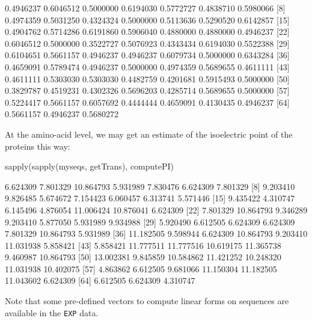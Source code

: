 \documentclass{article}
\begin{document}
\begin{Schunk}
\begin{Soutput}
 [1] 0.4946237 0.6046512 0.5000000 0.6194030 0.5772727 0.4838710 0.5980066
 [8] 0.4974359 0.5031250 0.4324324 0.5000000 0.5113636 0.5290520 0.6142857
[15] 0.4904762 0.5714286 0.6191860 0.5906040 0.4880000 0.4880000 0.4946237
[22] 0.6046512 0.5000000 0.3522727 0.5076923 0.4343434 0.6194030 0.5522388
[29] 0.6104651 0.5661157 0.4946237 0.4946237 0.6079734 0.5000000 0.6343284
[36] 0.4659091 0.5789474 0.4946237 0.5000000 0.4974359 0.5689655 0.4611111
[43] 0.4611111 0.5303030 0.5303030 0.4482759 0.4201681 0.5915493 0.5000000
[50] 0.3829787 0.4519231 0.4302326 0.5696203 0.4285714 0.5689655 0.5000000
[57] 0.5224417 0.5661157 0.6057692 0.4444444 0.4659091 0.4130435 0.4946237
[64] 0.5661157 0.4946237 0.5680272
\end{Soutput}
\end{Schunk}

At the amino-acid level, we may get an estimate of the isoelectric point of
the proteins this way:

\begin{Schunk}
\begin{Sinput}
 sapply(sapply(myseqs, getTrans), computePI)
\end{Sinput}
\begin{Soutput}
 [1]  6.624309  7.801329 10.864793  5.931989  7.830476  6.624309  7.801329
 [8]  9.203410  9.826485  5.674672  7.154423  6.060457  6.313741  5.571446
[15]  9.435422  4.310747  6.145496  4.876054 11.006424 10.876041  6.624309
[22]  7.801329 10.864793  9.346289  9.203410  5.877050  5.931989  9.934988
[29]  5.920490  6.612505  6.624309  6.624309  7.801329 10.864793  5.931989
[36] 11.182505  9.598944  6.624309 10.864793  9.203410 11.031938  5.858421
[43]  5.858421 11.777511 11.777516 10.619175 11.365738  9.460987 10.864793
[50] 13.002381  9.845859 10.584862 11.421252 10.248320 11.031938 10.402075
[57]  4.863862  6.612505  9.681066 11.150304 11.182505 11.043602  6.624309
[64]  6.612505  6.624309  4.310747
\end{Soutput}
\end{Schunk}

Note that some pre-defined vectors to compute linear forms on sequences are
available in the \texttt{EXP} data.
\end{document}
